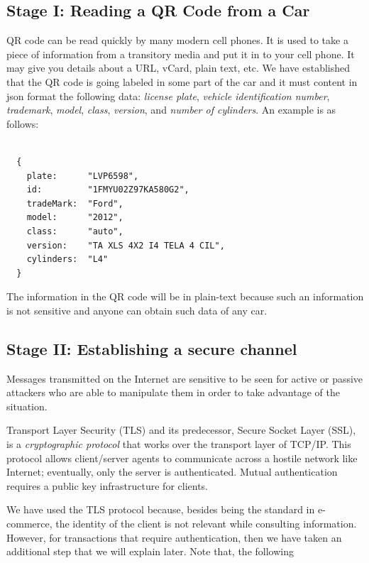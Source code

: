 \subsection{Stage I: Reading a QR Code from a Car}
\label{sec:readingQR}

QR code can be read quickly by many modern cell phones. It is used to take a piece of information from a 
transitory media and put it in to your cell phone. It may give you details about a URL, vCard, plain text, etc.
We have established that the QR code is going labeled in some part of the car and it must content in json format 
the following data: 
\textit{license plate}, 
\textit{vehicle identification number}, 
\textit{trademark}, 
\textit{model}, 
\textit{class}, 
\textit{version}, and
\textit{number of cylinders}.
An example is as follows:

\begin{lstlisting}
    
  {
    plate:      "LVP6598", 
    id:         "1FMYU02Z97KA580G2", 
    tradeMark:  "Ford", 
    model:      "2012", 
    class:      "auto", 
    version:    "TA XLS 4X2 I4 TELA 4 CIL", 
    cylinders:  "L4"
  }
\end{lstlisting}

The information in the QR code will be in plain-text because such an information is not sensitive and anyone 
can obtain such data of any car.


\subsection{Stage II: Establishing a secure channel}
\label{sec:secureChannel}
Messages transmitted on the Internet are sensitive to be seen for
active or passive attackers who are able to manipulate them in order
to take advantage of the situation.

Transport Layer Security (TLS) and its predecessor, Secure Socket
Layer (SSL), is a \emph{cryptographic protocol} that works over the transport 
layer of TCP/IP. This protocol allows client/server agents to communicate 
across a hostile network like Internet; eventually, only the server is authenticated. 
Mutual authentication requires a public key infrastructure for clients. 

We have used the TLS protocol because, besides being the 
standard in e-commerce, the identity of the client is not
relevant while consulting information. However, for transactions that 
require authentication, then we have taken an additional step that we will 
explain later. Note that, the following   

